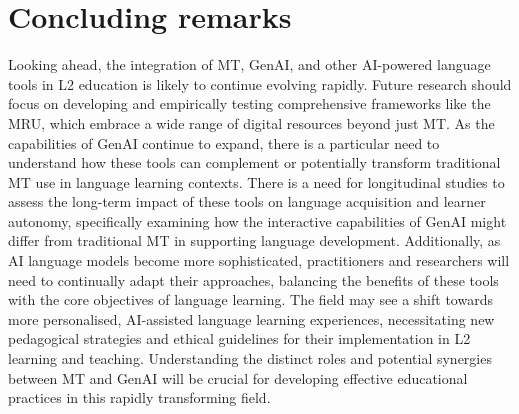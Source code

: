 \documentclass[output=paper]{langscibook}
\begin{document}
\section{Concluding remarks}

Looking ahead, the integration of MT, GenAI, and other AI-powered language tools in L2 education is likely to continue evolving rapidly. Future research should focus on developing and empirically testing comprehensive frameworks like the MRU, which embrace a wide range of digital resources beyond just MT. As the capabilities of GenAI continue to expand, there is a particular need to understand how these tools can complement or potentially transform traditional MT use in language learning contexts. There is a need for longitudinal studies to assess the long-term impact of these tools on language acquisition and learner autonomy, specifically examining how the interactive capabilities of GenAI might differ from traditional MT in supporting language development. Additionally, as AI language models become more sophisticated, practitioners and researchers will need to continually adapt their approaches, balancing the benefits of these tools with the core objectives of language learning. The field may see a shift towards more personalised, AI-assisted language learning experiences, necessitating new pedagogical strategies and ethical guidelines for their implementation in L2 learning and teaching. Understanding the distinct roles and potential synergies between MT and GenAI will be crucial for developing effective educational practices in this rapidly transforming field.

\sloppy\printbibliography[heading=subbibliography,notkeyword=this]
\end{document}
